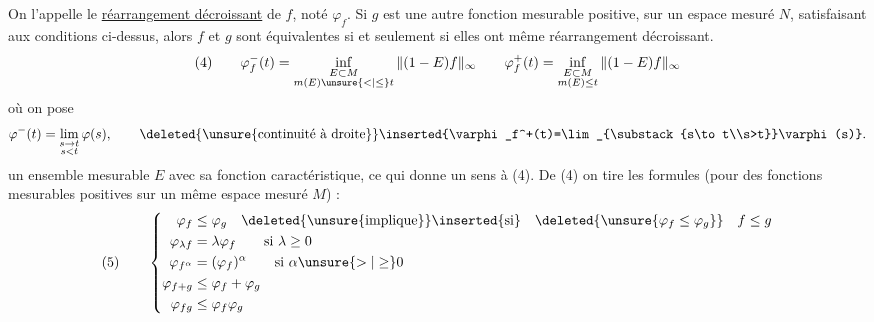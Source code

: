  On l'appelle le \uline{réarrangement décroissant} de \(f\), noté \(\varphi_f\). Si  \(g\) est une autre fonction mesurable positive, sur un espace mesuré \(N\), satisfaisant aux conditions ci-dessus, alors \(f\) et \(g\) sont  équivalentes si et seulement si elles ont même réarrangement décroissant.
\[
(4)\qquad
\varphi_f^-(t)=\inf_{\substack{E\subset M\\m(E)\unsure{<|\leq}t}}\|(1-E)f\|_\infty
\qquad
\varphi_f^+(t)=\inf_{\substack{E\subset M\\m(E)\leq t}}\|(1-E)f\|_\infty
\]
où  on pose
\[
\varphi^-(t)=\lim_{\substack{s\to t\\s<t}}\varphi(s),
\qquad\deleted{\unsure{\text{continuité à droite}}}\inserted{\varphi_f^+(t)=\lim_{\substack{s\to t\\s>t}}\varphi(s)}.
\]
 un ensemble mesurable \(E\) avec sa fonction caractéristique, ce qui donne un sens à (4). De (4) on tire les formules (pour des fonctions mesurables positives sur un même espace mesuré \(M\))  :
\[
(5)\qquad
\left\{\begin{aligned}
\varphi_f&\leq\varphi_g\quad\deleted{\unsure{\text{implique}}}\inserted{\text{si}}\quad\deleted{\unsure{\varphi_f\leq\varphi_g}}\quad f\leq g\\
\varphi_{\lambda f}&=\lambda\varphi_f\qquad\text{si }\lambda\geq0\\
\varphi_{f^\alpha}&=(\varphi_f)^\alpha\qquad\text{si }\alpha\unsure{>|\geq}0\\
\varphi_{f+g}&\leq\varphi_f+\varphi_g\\
\varphi_{fg}&\leq\varphi_f\varphi_g
\end{aligned}\right.
\]

